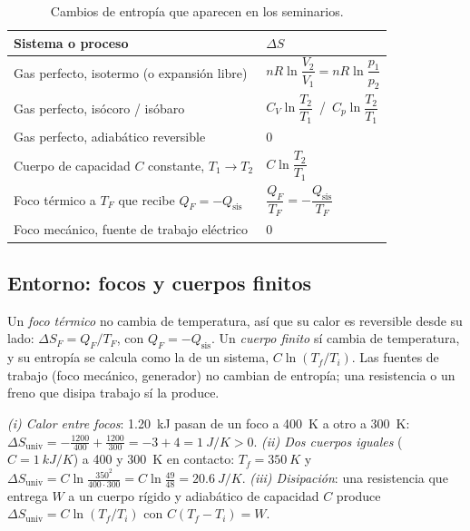 \begin{table}[htbp]
\centering
\caption{Cambios de entropía que aparecen en los seminarios.}
\label{tab:dS}
\small
\renewcommand{\arraystretch}{1.75}
\begin{tabular}{ll}
\toprule
Sistema o proceso & $\Delta S$\\
\midrule
Gas perfecto, isotermo (o expansión libre) & $nR\ln\dfrac{V_2}{V_1}=nR\ln\dfrac{p_1}{p_2}$\\
Gas perfecto, isócoro / isóbaro & $C_V\ln\dfrac{T_2}{T_1}$\ /\ $C_p\ln\dfrac{T_2}{T_1}$\\
Gas perfecto, adiabático reversible & $0$\\
Cuerpo de capacidad $C$ constante, $T_1\to T_2$ & $C\ln\dfrac{T_2}{T_1}$\\
Foco térmico a $T_F$ que recibe $Q_F=-Q_{\mathrm{sis}}$ & $\dfrac{Q_F}{T_F}=-\dfrac{Q_{\mathrm{sis}}}{T_F}$\\
Foco mecánico, fuente de trabajo eléctrico & $0$\\
\bottomrule
\end{tabular}
\end{table}

\subsection{Entorno: focos y cuerpos finitos}

Un \emph{foco térmico} no cambia de temperatura, así que su calor es reversible desde su lado:
$\Delta S_F=Q_F/T_F$, con $Q_F=-Q_{\mathrm{sis}}$. Un \emph{cuerpo finito} sí cambia de temperatura, y su entropía se
calcula como la de un sistema, $C\ln(T_f/T_i)$. Las fuentes de trabajo (foco mecánico, generador) no cambian
de entropía; una resistencia o un freno que disipa trabajo sí la produce.

\begin{ejemplo}
\emph{(i) Calor entre focos}: \SI{1,20}{kJ} pasan de un foco a \SI{400}{K} a otro a \SI{300}{K}:
$\Delta S_{\mathrm{univ}}=-\frac{1200}{400}+\frac{1200}{300}=-3+4=\SI{1}{J/K}>0$.
\emph{(ii) Dos cuerpos iguales} ($C=\SI{1}{kJ/K}$) a 400 y \SI{300}{K} en contacto: $T_f=\SI{350}{K}$ y
$\Delta S_{\mathrm{univ}}=C\ln\frac{350^2}{400\cdot300}=C\ln\frac{49}{48}=\SI{20,6}{J/K}$.
\emph{(iii) Disipación}: una resistencia que entrega $W$ a un cuerpo rígido y adiabático de capacidad $C$
produce $\Delta S_{\mathrm{univ}}=C\ln(T_f/T_i)$ con $C(T_f-T_i)=W$.
\end{ejemplo}


